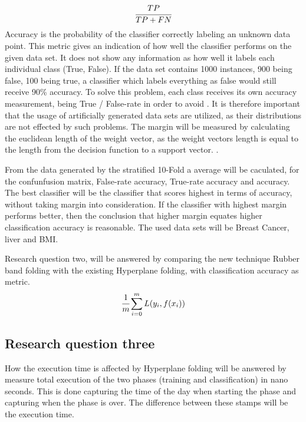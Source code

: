 \documentclass[a4paper,twoside]{bth}
\begin{document}
\begin{equation}\label{eq:truepositive}
\begin{aligned}
     \cfrac{TP}{TP + FN}
\end{aligned}
\end{equation} 
 Accuracy is the probability of the classifier correctly labeling an unknown data point. This metric gives an indication of how well the classifier performs on the given data set. It does not show any information as how well it labels each individual class (True, False). If the data set contains 1000 instances, 900 being false, 100 being true, a classifier which labels everything as false would still receive 90\% accuracy. To solve this problem, each class receives its own accuracy measurement, being True / False-rate in order to avoid  \cite{Japkowicz:2011}.  It is therefore important that the usage of artificially generated data sets are utilized, as their distributions are not effected by such problems.  The margin will be measured by calculating the euclidean length of the weight vector, as the weight vectors length is equal to the length from the decision function to a support vector. \cite{Cortes:1995:SN:218919.218929, Flach:2012:MLA:2490546}. \par From the data generated by the stratified 10-Fold a average will be caculated, for the confunfusion matrix, False-rate accuracy, True-rate accuracy and accuracy. The best classifier will be the classifier that scores highest in terms of accuracy, without taking margin into consideration. If the classifier with highest margin performs better, then the conclusion that higher margin equates higher classification accuracy is reasonable. The used data sets will be Breast Cancer, liver and BMI.  \par
Research question two, will be answered by comparing the new technique Rubber band folding with the existing Hyperplane folding, with classification accuracy as metric. 
\begin{equation}\label{eq:risk}
    \cfrac{1}{m}\sum_{i=0}^{m} L(y_i, f(x_i))
\end{equation}
\subsection{Research question three} How the execution time is affected by Hyperplane folding will be answered by measure total execution of the two phases (training and classification) in nano seconds. This is done capturing the time of the day when starting the phase and capturing when the phase is over. The difference between these stamps will be the execution time. 
\end{document}

